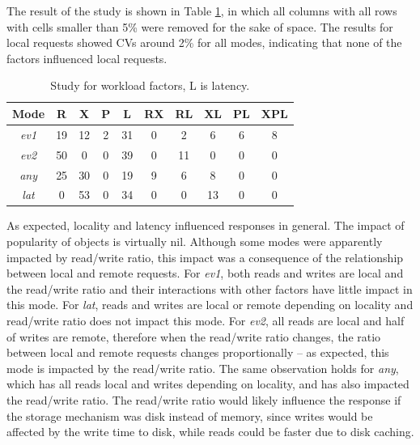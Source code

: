 \documentclass[doublespacing]{bmcart}
\begin{document}
The result of the study is shown in Table
\ref{tab:estudo_para_fatores_de_carga_de_trabalho}, in which all columns with
all rows with cells smaller than 5\% were removed for the sake of space. The results for local
requests showed CVs around 2\% for all modes, indicating that none of the
factors influenced local requests.

\begin{table}[h!]
\caption{Study for workload factors, L is latency.}
\begin{tabular}{cccccccccc} \hline

Mode & R & X & P & L & RX & RL & XL & PL & XPL\\\hline

\textit{ev1} & 19 & 12 & 2 & 31 & 0 & 2 & 6 & 6 & 8\\

\textit{ev2} & 50 & 0 & 0 & 39 & 0 & 11 & 0 & 0 & 0\\

\textit{any} & 25 & 30 & 0 & 19 & 9 & 6 & 8 & 0 & 0\\

\textit{lat} & 0 & 53 & 0 & 34 & 0 & 0 & 13 & 0 & 0\\\hline

\end{tabular} 
\label{tab:estudo_para_fatores_de_carga_de_trabalho}
\end{table}

As expected, locality and latency influenced responses in general. The impact of
popularity of objects is virtually nil. Although some modes were apparently
impacted by read/write ratio, this impact was a consequence of the relationship
between local and remote requests. For \textit{ev1}, both reads and writes are
local and the read/write ratio and their interactions with other factors have little impact in this mode. For \textit{lat}, reads and writes are local or remote
depending on locality and read/write ratio does not impact this mode. For
\textit{ev2}, all reads are local and half of writes are remote, therefore when
the read/write ratio changes, the ratio between local and remote requests
changes proportionally -- as expected, this mode is impacted by the read/write ratio.
The same observation holds for \textit{any}, which has all reads local and
writes depending on locality, and has also impacted the read/write ratio. The
read/write ratio would likely influence the response if the storage mechanism
was disk instead of memory, since writes would be affected by the write
time to disk, while reads could be faster due to disk caching.
\end{document}
